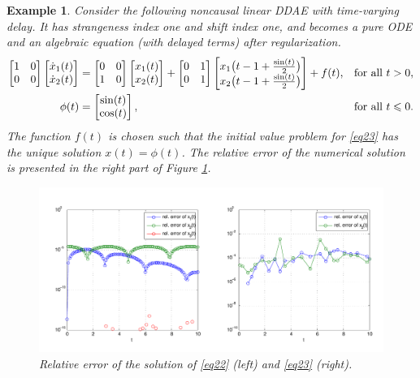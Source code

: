 \documentclass[final,reqno]{siamltex}
\renewenvironment{enumerate}[1]{\begin{compactenum}#1}{\end{compactenum}}
\newtheorem{example}[theorem]{Example}
\begin{document}
\begin{example} {\rm Consider the following noncausal linear DDAE with time-varying delay.
It has strangeness index one and shift index one, and becomes a pure ODE and an algebraic equation (with delayed terms) after regularization.
%
\begin{equation}\label{eq23}
\begin{aligned}
\m{
1&0\\
0&0 \\
}
\m{\dot{x}_1(t) \\ \dot{x}_2(t)} &=
\m{
0&0\\
1&0 \\
}
\m{x_1(t) \\ x_2(t)} +
\m{
0&1\\
0&1
}
\m{x_1\bigl(t-1+\frac{\sin(t)}2\bigr) \\ x_2\bigl(t-1+\frac{\sin(t)}2\bigr)}
+f(t), && \mbox{for all } t>0,\\
\phi(t) &=
\m{
\sin(t)\\
\cos(t)
},
&& \mbox{for all } t \leq 0.
\end{aligned}
\end{equation}
%
The function $f(t)$ is chosen such that the initial value problem for  \eqref{eq23} has the unique solution $x(t)=\phi(t)$.
The relative error of the numerical solution  is presented in the right part of Figure \ref{fig_222}.
%
\begin{figure}[h!]
 \centering
 \includegraphics[width=\textwidth]{plot_222_varshifted.pdf}
 \caption{Relative error of the solution of \eqref{eq22} (left) and \eqref{eq23} (right).}
 \label{fig_222}
\end{figure}
}
\end{example}
%
\end{document}
